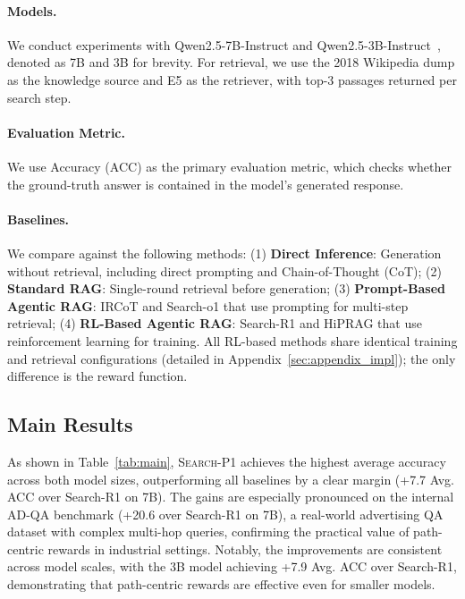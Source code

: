 \documentclass[11pt]{article}
\newcommand{\method}{\textsc{Search-P1}\xspace}
\begin{document}
\paragraph{Models.}
We conduct experiments with Qwen2.5-7B-Instruct and Qwen2.5-3B-Instruct~\cite{qwen2025qwen25technicalreport}, denoted as 7B and 3B for brevity.
For retrieval, we use the 2018 Wikipedia dump as the knowledge source and E5 as the retriever, with top-3 passages returned per search step.

\paragraph{Evaluation Metric.}
We use Accuracy (ACC) as the primary evaluation metric, which checks whether the ground-truth answer is contained in the model's generated response.

\paragraph{Baselines.}
We compare against the following methods:
(1) \textbf{Direct Inference}: Generation without retrieval, including direct prompting and Chain-of-Thought (CoT);
(2) \textbf{Standard RAG}: Single-round retrieval before generation;
(3) \textbf{Prompt-Based Agentic RAG}: IRCoT and Search-o1 that use prompting for multi-step retrieval;
(4) \textbf{RL-Based Agentic RAG}: Search-R1 and HiPRAG that use reinforcement learning  for training.
All RL-based methods share identical training and retrieval configurations (detailed in Appendix~\ref{sec:appendix_impl}); the only difference is the reward function.

\subsection{Main Results}

As shown in Table~\ref{tab:main}, \method achieves the highest average accuracy across both model sizes, outperforming all baselines by a clear margin (+7.7 Avg. ACC over Search-R1 on 7B).
The gains are especially pronounced on the internal AD-QA benchmark (+20.6 over Search-R1 on 7B), a real-world advertising QA dataset with complex multi-hop queries, confirming the practical value of path-centric rewards in industrial settings.
Notably, the improvements are consistent across model scales, with the 3B model achieving +7.9 Avg. ACC over Search-R1, demonstrating that path-centric rewards are effective even for smaller models.
\end{document}
